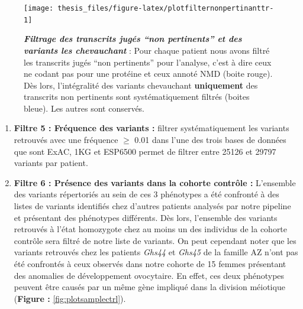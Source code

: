 \documentclass[12pt,a4paper,twoside]{ugathesis}
\theoremstyle{definition}
\theoremstyle{definition}
\theoremstyle{definition}
\theoremstyle{remark}
\begin{document}
\begin{figure}

{\centering \texttt{[image: thesis\_files/figure-latex/plotfilternonpertinanttr-1]} 

}

\caption[Filtrage des transcrits jugés "non pertinents" et des variants les chevauchant]{\textbf{\emph{Filtrage des transcrits
jugés ``non pertinents'' et des variants les chevauchant}} : Pour chaque
patient nous avons filtré les transcrits jugés ``non pertinents'' pour
l'analyse, c'est à dire ceux ne codant pas pour une protéine et ceux
annoté NMD (boite rouge). Dès lors, l'intégralité des variants
chevauchant \textbf{uniquement} des transcrits non pertinents sont
systématiquement filtrés (boites bleue). Les autres sont conservés.}\label{fig:plotfilternonpertinanttr}
\end{figure}









\begin{enumerate}
\def\labelenumi{\arabic{enumi}.}
\setcounter{enumi}{4}
\item
  \textbf{Filtre 5 : Fréquence des variants :} filtrer systématiquement
  les variants retrouvés avec une fréquence \(\ge\) 0.01 dans l'une des
  trois bases de données que sont ExAC, 1KG et ESP6500 permet de filtrer
  entre 25126 et 29797 variants par patient.
\item
  \textbf{Filtre 6 : Présence des variants dans la cohorte contrôle :}
  L'ensemble des variants répertoriés au sein de ces 3 phénotypes a été
  confronté à des listes de variants identifiés chez d'autres patients
  analysés par notre pipeline et présentant des phénotypes différents.
  Dès lors, l'ensemble des variants retrouvés à l'état homozygote chez
  au moins un des individus de la cohorte contrôle sera filtré de notre
  liste de variants. On peut cependant noter que les variants retrouvés
  chez les patients \emph{Ghs44} et \emph{Ghs45} de la famille AZ n'ont
  pas été confrontés à ceux observés dans notre cohorte de 15 femmes
  présentant des anomalies de développement ovocytaire. En effet, ces
  deux phénotypes peuvent être causés par un même gène impliqué dans la
  division méiotique (\textbf{Figure :} \ref{fig:plotsamplectrl}).\\
  \newpage
\end{enumerate}
\end{document}
